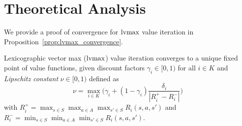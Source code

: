 \section{Theoretical Analysis}
\label{sec:theoretical_analysis}

We provide a proof of convergence for $\operatorname*{lvmax}$ value iteration in Proposition~\ref{prop:lvmax_convergence}.

\begin{proposition}
    \label{prop:lvmax_convergence}
    Lexicographic vector max ($\operatorname*{lvmax}$) value iteration converges to a unique fixed point of value functions, given discount factors $\gamma_i \in [0, 1)$ for all $i \in K$ and \emph{Lipschitz constant} $\nu \in [0, 1)$ defined as
    \begin{equation}
        \label{eq:lvmax_convergece_nu}
        \nu = \max_{i \in K} \Big( \gamma_i + (1 - \gamma_i) \frac{\delta_i}{|R_i^+ - R_i^-|} \Big)
    \end{equation}
    with $R_i^+ = \max_{s \in S} \max_{a \in A} \max_{s' \in S} R_i(s, a, s')$ and $R_i^- = \min_{s \in S} \min_{a \in A} \min_{s' \in S} R_i(s, a, s')$.
\end{proposition}

